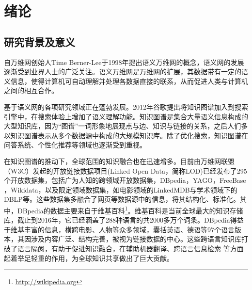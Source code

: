 \chapter{绪论}
\label{cha:intro}

\section{研究背景及意义}

自万维网创始人Time Berner-Lee于1998年提出语义万维网的概念，语义网的发展逐渐受到业界人士的广泛关注。语义万维网是万维网的扩展，其数据带有一定的语义信息，使得计算机可自动理解并处理各数据直接的联系，从而促进人类与计算机之间的相互合作。

基于语义网的各项研究领域正在蓬勃发展。2012年谷歌提出将知识图谱\cite{singhal2012introducing}加入到搜索引擎中，在搜索体验上增加了语义理解功能。知识图谱是集合大量语义信息构成的大型知识库，因为“图谱”一词形象地展现点与边、知识与链接的关系，之后人们多以知识图谱表示从多个数据源中构成的大规模知识库。除了优化搜索，知识图谱在问答系统\cite{yih2015semantic,yang2014joint}、个性化推荐\cite{kaminskas2012knowledge}等领域也逐渐受到重视。

在知识图谱的推动下，全球范围的知识融合也在迅速增多。目前由万维网联盟（W3C）发起的开放链接数据项目(Linked Open Data，简称LOD)已经发布了295个开放数据集，包括广为人知的跨领域开放数据集，DBpedia\cite{auer2007dbpedia,bizer2009dbpedia,lehmann2015dbpedia}，YAGO\cite{suchanek2007yago,suchanek2008yago,hoffart2013yago2,mahdisoltani2014yago3}，FreeBase \cite{bollacker2008freebase}，Wikidata\cite{vrandevcic2014wikidata,erxleben2014introducing}，以及限定领域数据集，如电影领域的LinkedMDB\cite{hassanzadeh2009linked}与学术领域下的DBLP等。这些数据集多融合了网页等数据源中的信息，将其结构化、标准化。其中，DBpedia的数据主要来自于维基百科\footnote{\url{http://wikipedia.org}}。维基百科是当前全球最大的知识存储库，截止到2016年，它已经涵盖了288种语言的共2000多万个词条。DBpedia得益于维基丰富的信息，横跨电影、人物等众多领域，囊括英语、德语等97个语言版本，其因涉及内容广泛、结构完善，被视为链接数据的中心。这些跨语言知识库打破了语言隔阂，有助于促进知识融合，在辅助机器翻译\cite{niehues2011using}、跨语言信息检索\cite{giang2015building} 等方面起着举足轻重的作用，为全球知识共享做出了巨大贡献。

